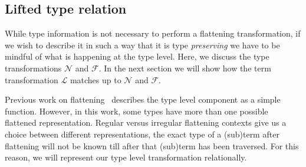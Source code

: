 







\subsection{Lifted type relation}

While type information is not necessary to perform a flattening transformation, if we wish to describe it in such a way that it is type \emph{preserving} we have to be mindful of what is happening at the type level. Here, we discuss the type transformations $\mathcal{N}$ and $\mathcal{F}$. In the next section we will show how the term transformation $\mathcal{L}$ matches up to $\mathcal{N}$ and $\mathcal{F}$.

Previous work on flattening~\cite{Chakravarty:more-types} describes the type level component as a simple function. However, in this work, some types have more than one possible flattened representation. Regular versus irregular flattening contexts give us a choice between different representations, the exact type of a (sub)term after flattening will not be known till after that (sub)term has been traversed. For this reason, we will represent our type level transformation relationally.

